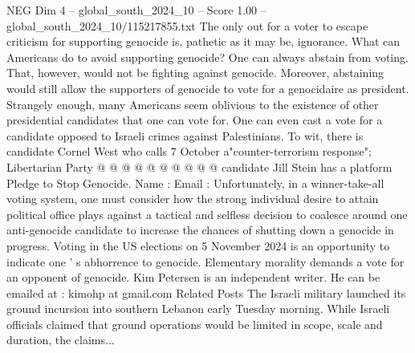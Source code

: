 \begin{textsample}{NEG Dim 4 – global\_south\_2024\_10 – Score 1.00 – global\_south\_2024\_10/115217855.txt}
The only out for a voter to escape criticism for supporting genocide is, pathetic as it may be, ignorance.
What can Americans do to avoid supporting genocide?
One can always abstain from voting.
That, however, would not be fighting against genocide.
Moreover, abstaining would still allow the supporters of genocide to vote for a genocidaire as president.
Strangely enough, many Americans seem oblivious to the existence of other presidential candidates that one can vote for.
One can even cast a vote for a candidate opposed to Israeli crimes against Palestinians.
To wit, there is candidate Cornel West who calls 7 October a"counter-terrorism response"; Libertarian Party @ @ @ @ @ @ @ @ @ @ candidate Jill Stein has a platform Pledge to Stop Genocide.
Name : Email : Unfortunately, in a winner-take-all voting system, one must consider how the strong individual desire to attain political office plays against a tactical and selfless decision to coalesce around one anti-genocide candidate to increase the chances of shutting down a genocide in progress.
Voting in the US elections on 5 November 2024 is an opportunity to indicate one ' s abhorrence to genocide.
Elementary morality demands a vote for an opponent of genocide.
Kim Petersen is an independent writer.
He can be emailed at : kimohp at gmail.com Related Posts The Israeli military launched its ground incursion into southern Lebanon early Tuesday morning.
While Israeli officials claimed that ground operations would be limited in scope, scale and duration, the claims...

\end{textsample}
